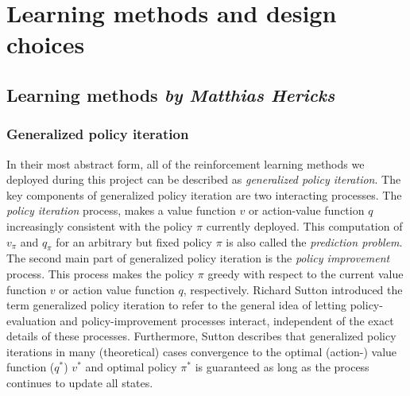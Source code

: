\chapter{Learning methods and design choices}
\section[Learning method]{Learning methods \hfill \small \normalfont\textit{by Matthias Hericks}}

\subsection{Generalized policy iteration}

In their most abstract form, all of the reinforcement learning methods we deployed during this project can be described as \emph{generalized policy iteration}. The key components of generalized policy iteration are two interacting processes. The \emph{policy iteration} process, makes a value function $v$ or action-value function $q$ increasingly consistent with the policy $\pi$ currently deployed. This computation of $v_\pi$ and $q_\pi$ for an arbitrary but fixed policy $\pi$ is also called the \emph{prediction problem}. The second main part of generalized policy iteration is the \emph{policy improvement} process. This process makes the policy $\pi$ greedy with respect to the current value function $v$ or action value function $q$, respectively. Richard Sutton introduced the term generalized policy iteration to refer to the general idea of letting policy-evaluation and policy-improvement processes interact, independent of the exact details of these processes. Furthermore, Sutton describes that generalized policy iterations in many (theoretical) cases convergence to the optimal (action-) value function ($q^\ast$) $v^\ast$ and optimal policy $\pi^\ast$ is guaranteed as long as the process continues to update all states. 

